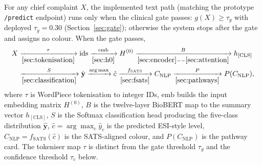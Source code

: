 For any chief complaint \(X\), the implemented text path (matching the prototype \texttt{/predict} endpoint) runs only when the clinical gate passes: \(g(X)\ge\tau_g\) with deployed \(\tau_g=0.30\) (Section~\ref{sec:gate}); otherwise the system stops after the gate and assigns no colour. When the gate passes,
\begin{equation}
\begin{aligned}
  X &\xrightarrow[\ref{sec:tokenisation}]{\tau} \mathrm{ids}
    \xrightarrow[\ref{sec:h0}]{\mathrm{emb}} H^{(0)}
    \xrightarrow[\ref{sec:encoder}--\ref{sec:attention}]{B} h_{\mathrm{[CLS]}} \\
  &\xrightarrow[\ref{sec:classification}]{S} \hat{\mathbf{y}}
    \xrightarrow{\arg\max} \hat{c}
    \xrightarrow[\ref{sec:fsats}]{f_{\mathrm{SATS}}} C_{\mathrm{NLP}}
    \xrightarrow[\ref{sec:pathways}]{P} P(C_{\mathrm{NLP}}),
\end{aligned}
  \label{eq:e2e-chain}
\end{equation}
where \(\tau\) is WordPiece tokenisation to integer IDs, \(\mathrm{emb}\) builds the input embedding matrix \(H^{(0)}\), \(B\) is the twelve-layer BioBERT map to the summary vector \(h_{\mathrm{[CLS]}}\), \(S\) is the Softmax classification head producing the five-class distribution \(\hat{\mathbf{y}}\), \(\hat{c}=\arg\max_c\hat{y}_c\) is the predicted ESI-style level, \(C_{\mathrm{NLP}}=f_{\mathrm{SATS}}(\hat{c})\) is the SATS-aligned colour, and \(P(C_{\mathrm{NLP}})\) is the pathway card. The tokeniser map \(\tau\) is distinct from the gate threshold \(\tau_g\) and the confidence threshold \(\tau_c\) below.

